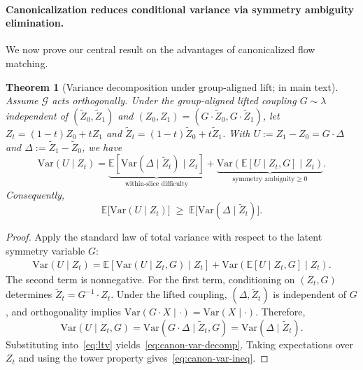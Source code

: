 \documentclass{article}
\theoremstyle{plain}
\newtheorem{theorem}{Theorem}[section]
\theoremstyle{definition}
\theoremstyle{remark}
\newcommand{\1}{\mathbf{1}}
\begin{document}
\paragraph{Canonicalization reduces conditional variance via symmetry ambiguity elimination.} We now prove our central result on the advantages of canonicalized flow matching.
\begin{theorem}[Variance decomposition under group-aligned lift;  in main text]
Assume $\mathcal{G}$ acts orthogonally. Under the group-aligned lifted coupling
$G\sim\lambda$ independent of $(\widetilde Z_0,\widetilde Z_1)$ and $(Z_0,Z_1)=(G\cdot\widetilde Z_0,G\cdot\widetilde Z_1)$,
let $Z_t=(1-t)Z_0+tZ_1$ and $\widetilde Z_t=(1-t)\widetilde Z_0+t\widetilde Z_1$.
With $U:=Z_1-Z_0=G\cdot\Delta$ and $\Delta:=\widetilde Z_1-\widetilde Z_0$, we have
\begin{equation}
\mathrm{Var}(U\mid Z_t)
=
\underbrace{\mathbb{E}\!\left[\mathrm{Var}(\Delta\mid \widetilde Z_t)\mid Z_t\right]}_{\text{within-slice difficulty}}
+
\underbrace{\mathrm{Var}\!\left(\mathbb{E}[U\mid Z_t,G]\mid Z_t\right)}_{\text{symmetry ambiguity}\ge 0}.
\end{equation}
Consequently,
\begin{equation}
\mathbb{E}\big[\mathrm{Var}(U\mid Z_t)\big]\;\ge\;\mathbb{E}\big[\mathrm{Var}(\Delta\mid \widetilde Z_t)\big].
\end{equation}
\end{theorem}

\begin{proof}
Apply the standard law of total variance with respect to the latent symmetry variable $G$:
\begin{equation}
\label{eq:ltv}
\begin{aligned}
\mathrm{Var}(U\mid Z_t)=
\mathbb{E}\!\left[\mathrm{Var}(U\mid Z_t,G)\mid Z_t\right]
+\mathrm{Var}\!\left(\mathbb{E}[U\mid Z_t,G]\mid Z_t\right).
\end{aligned}
\end{equation}
The second term is nonnegative. For the first term, conditioning on $(Z_t,G)$ determines $\widetilde Z_t = G^{-1}\cdot Z_t$. Under the lifted coupling, $(\Delta,\widetilde Z_t)$ is independent of $G$, and orthogonality implies $\mathrm{Var}(G\cdot X\mid \cdot)=\mathrm{Var}(X\mid \cdot)$. Therefore,
\begin{equation}
\mathrm{Var}(U\mid Z_t,G)=\mathrm{Var}(G\cdot\Delta\mid \widetilde Z_t,G)
=\mathrm{Var}(\Delta\mid \widetilde Z_t).
\end{equation}
Substituting into~\eqref{eq:ltv} yields~\eqref{eq:canon-var-decomp}. Taking expectations over $Z_t$ and using the tower property gives~\eqref{eq:canon-var-ineq}.
\end{proof}
\end{document}
